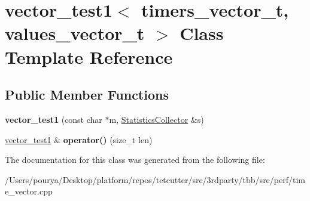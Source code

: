 \hypertarget{classvector__test1}{}\section{vector\+\_\+test1$<$ timers\+\_\+vector\+\_\+t, values\+\_\+vector\+\_\+t $>$ Class Template Reference}
\label{classvector__test1}
\subsection*{Public Member Functions}
\begin{DoxyCompactItemize}
\item 
\hypertarget{classvector__test1_af6a1f683d0f6b60bf66f9d207070b780}{}{\bfseries vector\+\_\+test1} (const char $\ast$m, \hyperlink{classStatisticsCollector}{Statistics\+Collector} \&s)\label{classvector__test1_af6a1f683d0f6b60bf66f9d207070b780}

\item 
\hypertarget{classvector__test1_a3839a9f31cdf99a2c4e562c2c4b39342}{}\hyperlink{classvector__test1}{vector\+\_\+test1} \& {\bfseries operator()} (size\+\_\+t len)\label{classvector__test1_a3839a9f31cdf99a2c4e562c2c4b39342}

\end{DoxyCompactItemize}


The documentation for this class was generated from the following file\+:\begin{DoxyCompactItemize}
\item 
/\+Users/pourya/\+Desktop/platform/repos/tetcutter/src/3rdparty/tbb/src/perf/time\+\_\+vector.\+cpp\end{DoxyCompactItemize}
